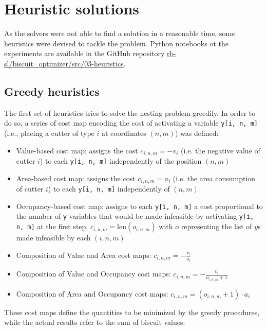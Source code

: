 
\section{Heuristic solutions}\label{sec:heuristics}
As the solvers were not able to find a solution in a reasonable time, some heuristics were devised to tackle the problem. Python notebooks ot the experiments are available in the GitHub repository  \href{https://github.com/rb-sl/biscuit_optimizer/tree/main/src/03-heuristics}{rb-sl/biscuit\_optimizer/src/03-heuristics}.

\subsection{Greedy heuristics}\label{sec:greedy}
The first set of heuristics tries to solve the nesting problem greedily. In order to do so, a series of cost map encoding the cost of activating a variable \texttt{y[i, n, m]} (i.e., placing a cutter of type $i$ at coordinates $(n, m)$) was defined:
\begin{itemize}[itemsep=-1mm, topsep=0mm]
	\item Value-based cost map: assigns the cost $c_{i,n,m} = -v_i$ (i.e. the negative value of cutter $i$) to each \texttt{y[i, n, m]} independently of the position $(n, m)$
	\item Area-based cost map: assigns the cost $c_{i,n,m} = a_i$ (i.e. the area consumption of cutter $i$) to each \texttt{y[i, n, m]} independently of $(n, m)$
	\item Occupancy-based cost map: assigns to each \texttt{y[i, n, m]} a cost proportional to the number of \texttt{y} variables that would be made infeasible by activating \texttt{y[i, n, m]} at the first step, $c_{i, n, m} = \textrm{len}(o_{i, n, m})$ with $o$ representing the list of $y$s made infeasible by each $(i, n, m)$
	\item Composition of Value and Area cost maps: $c_{i, n, m} = -\frac{v_i}{a_i}$
	\item Composition of Value and Occupancy cost maps: $c_{i, n, m} = -\frac{v_i}{o_{i, n, m} + 1}$
	\item Composition of Area and Occupancy cost maps: $c_{i, n, m} = (o_{i, n, m} + 1) \cdot a_i$
\end{itemize}
These cost maps define the quantities to be minimized by the greedy procedures, while the actual results refer to the sum of biscuit values. 

